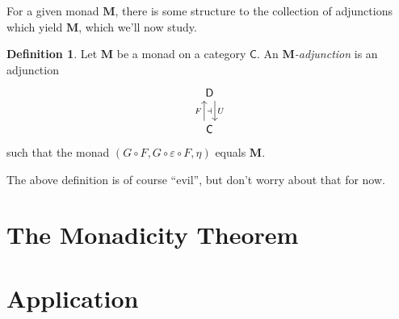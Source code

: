 \documentclass{article}
\theoremstyle{definition}
\newtheorem{defn}{Definition}
\newcommand{\C}{\mathsf{C}}
\newcommand{\D}{\mathsf{D}}
\begin{document}
For a given monad $\mathbf{M}$, there is some structure to the collection of adjunctions which yield $\mathbf{M}$, which we'll now study.

\begin{defn}
Let $\mathbf{M}$ be a monad on a category $\C$. An \emph{$\mathbf{M}$-adjunction} is an adjunction
\[\begin{tikzcd}[ampersand replacement=\&]
	\D \\
	\C
	\arrow[""{name=0, anchor=center, inner sep=0}, "U", shift left=2, from=1-1, to=2-1]
	\arrow[""{name=1, anchor=center, inner sep=0}, "F", shift left=2, from=2-1, to=1-1]
	\arrow["\dashv"{anchor=center}, draw=none, from=1, to=0]
\end{tikzcd}\]
such that the monad $(G \circ F, G \circ \varepsilon \circ F, \eta)$ equals $\mathbf{M}$.
\end{defn}

The above definition is of course ``evil'', but don't worry about that for now.

\section{The Monadicity Theorem}

\section{Application}
\end{document}
